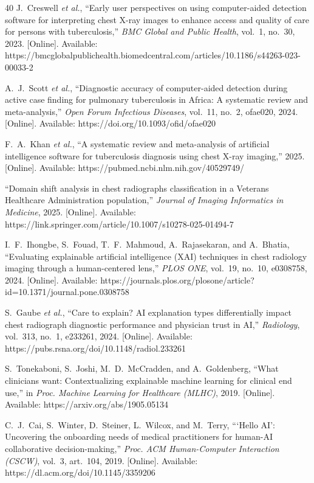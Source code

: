 \documentclass[conference, letterpaper]{IEEEtran}
\begin{document}
\begin{thebibliography}{40}
J.~Creswell \textit{et al.}, ``Early user perspectives on using computer-aided detection software for interpreting chest X-ray images to enhance access and quality of care for persons with tuberculosis,'' \textit{BMC Global and Public Health}, vol.~1, no.~30, 2023. [Online]. Available: https://bmcglobalpublichealth.biomedcentral.com/articles/10.1186/s44263-023-00033-2

A.~J.~Scott \textit{et al.}, ``Diagnostic accuracy of computer-aided detection during active case finding for pulmonary tuberculosis in Africa: A systematic review and meta-analysis,'' \textit{Open Forum Infectious Diseases}, vol.~11, no.~2, ofae020, 2024. [Online]. Available: https://doi.org/10.1093/ofid/ofae020

F.~A.~Khan \textit{et al.}, ``A systematic review and meta-analysis of artificial intelligence software for tuberculosis diagnosis using chest X-ray imaging,'' 2025. [Online]. Available: https://pubmed.ncbi.nlm.nih.gov/40529749/

``Domain shift analysis in chest radiographs classification in a Veterans Healthcare Administration population,'' \textit{Journal of Imaging Informatics in Medicine}, 2025. [Online]. Available: https://link.springer.com/article/10.1007/s10278-025-01494-7

I.~F.~Ihongbe, S.~Fouad, T.~F.~Mahmoud, A.~Rajasekaran, and A.~Bhatia, ``Evaluating explainable artificial intelligence (XAI) techniques in chest radiology imaging through a human-centered lens,'' \textit{PLOS ONE}, vol.~19, no.~10, e0308758, 2024. [Online]. Available: https://journals.plos.org/plosone/article?id=10.1371/journal.pone.0308758

S.~Gaube \textit{et al.}, ``Care to explain? AI explanation types differentially impact chest radiograph diagnostic performance and physician trust in AI,'' \textit{Radiology}, vol.~313, no.~1, e233261, 2024. [Online]. Available: https://pubs.rsna.org/doi/10.1148/radiol.233261

S.~Tonekaboni, S.~Joshi, M.~D.~McCradden, and A.~Goldenberg, ``What clinicians want: Contextualizing explainable machine learning for clinical end use,'' in \textit{Proc. Machine Learning for Healthcare (MLHC)}, 2019. [Online]. Available: https://arxiv.org/abs/1905.05134

C.~J.~Cai, S.~Winter, D.~Steiner, L.~Wilcox, and M.~Terry, ```Hello AI': Uncovering the onboarding needs of medical practitioners for human-AI collaborative decision-making,'' \textit{Proc. ACM Human-Computer Interaction (CSCW)}, vol.~3, art.~104, 2019. [Online]. Available: https://dl.acm.org/doi/10.1145/3359206


\end{thebibliography}
\end{document}
